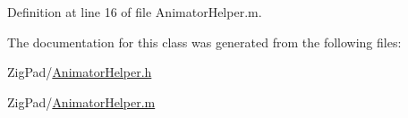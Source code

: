 Definition at line 16 of file AnimatorHelper.m.



The documentation for this class was generated from the following files:\begin{DoxyCompactItemize}
\item 
ZigPad/\hyperlink{_animator_helper_8h}{AnimatorHelper.h}\item 
ZigPad/\hyperlink{_animator_helper_8m}{AnimatorHelper.m}\end{DoxyCompactItemize}
